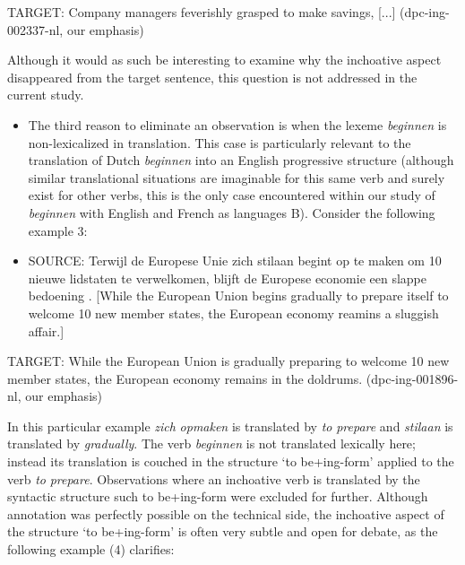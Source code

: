 TARGET: Company managers feverishly grasped to make savings, [...] (dpc-ing-002337-nl, our emphasis)



Although it would as such be interesting to examine why the inchoative aspect disappeared from the target sentence, this question is not addressed in the current study.


\begin{itemize}
\item 
The third reason to eliminate an observation is when the lexeme \textit{beginnen} is non-lexicalized in translation. This case is particularly relevant to the translation of Dutch \textit{beginnen} into an English progressive structure (although similar translational situations are imaginable for this same verb and surely exist for other verbs, this is the only case encountered within our study of \textit{beginnen} with English and French as languages B). Consider the following example 3:
\end{itemize}
\begin{itemize}
\item \begin{styleVoorbeeld}
SOURCE: Terwijl de Europese Unie zich stilaan begint op te maken om 10 nieuwe lidstaten te verwelkomen, blijft de Europese economie een slappe bedoening . [While the European Union begins gradually to prepare itself to welcome 10 new member states, the European economy reamins a sluggish affair.]
\end{styleVoorbeeld}\end{itemize}
\begin{styleVoorbeeld}
  TARGET: While the European Union is gradually preparing to welcome 10 new member states, the European economy remains in the doldrums. (dpc-ing-001896-nl, our emphasis)
\end{styleVoorbeeld}


In this particular example \textit{zich} \textit{opmaken} is translated by \textit{to} \textit{prepare} and \textit{stilaan} is translated by \textit{gradually}. The verb \textit{beginnen} is not translated lexically here; instead its translation is couched in the structure ‘to be+ing-form’ applied to the verb \textit{to} \textit{prepare}. Observations where an inchoative verb is translated by the syntactic structure such to be+ing-form were excluded for further. Although annotation was perfectly possible on the technical side, the inchoative aspect of the structure ‘to be+ing-form’ is often very subtle \citep{smith_parameter_1997} and open for debate, as the following example (4) clarifies:


